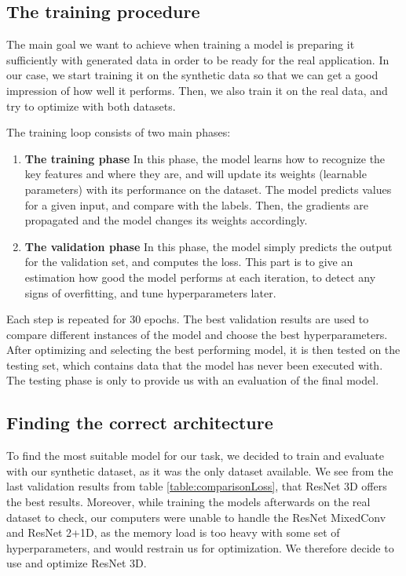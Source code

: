 \documentclass[10pt,conference]{IEEEtran}
\begin{document}
\subsection{The training procedure}
The main goal we want to achieve when training a model is preparing it sufficiently with generated data in order to be ready for the real application. In our case, we start training it on the synthetic data so that we can get a good impression of how well it performs. Then, we also train it on the real data, and try to optimize with both datasets.\par
The training loop consists of two main phases:
\begin{enumerate}
    \item {\bf The training phase} In this phase, the model learns how to recognize the key features and where they are, and will update its weights (learnable parameters) with its performance on the dataset. The model predicts values for a given input, and compare with the labels. Then, the gradients are propagated and the model changes its weights accordingly.
    \item {\bf The validation phase} In this phase, the model simply predicts the output for the validation set, and computes the loss. This part is to give an estimation how good the model performs at each iteration, to detect any signs of overfitting, and tune hyperparameters later.
\end{enumerate}
Each step is repeated for 30 epochs. The best validation results are used to compare different instances of the model and choose the best hyperparameters. After optimizing and selecting the best performing model, it is then tested on the testing set, which contains data that the model has never been executed with. The testing phase is only to provide us with an evaluation of the final model.

\subsection{Finding the correct architecture}
To find the most suitable model for our task, we decided to train and evaluate with our synthetic dataset, as it was the only dataset available. We see from the last validation results from table \ref{table:comparisonLoss}, that ResNet 3D offers the best results. Moreover, while training the models afterwards on the real dataset to check, our computers were unable to handle the ResNet MixedConv and ResNet 2+1D, as the memory load is too heavy with some set of hyperparameters, and would restrain us for optimization. We therefore decide to use and optimize ResNet 3D. 
\end{document}
